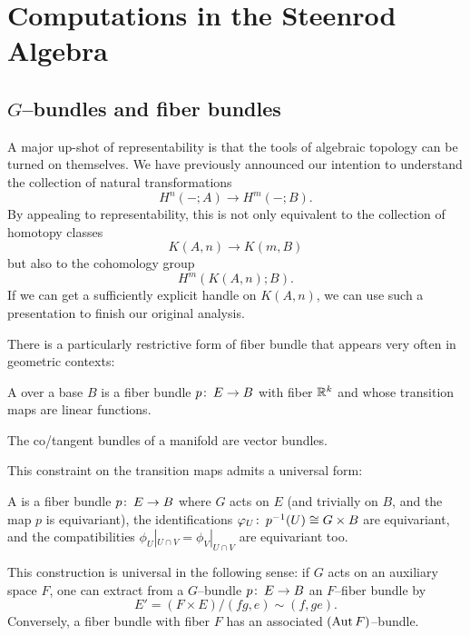 
\chapter{Computations in the Steenrod Algebra}





\section{$G$--bundles and fiber bundles}

A major up-shot of representability is that the tools of algebraic topology can be turned on themselves.
We have previously announced our intention to understand the collection of natural transformations \[H^n(-; A) \to H^m(-; B).\]
By appealing to representability, this is not only equivalent to the collection of homotopy classes \[K(A, n) \to K(m, B)\] but also to the cohomology group \[H^m(K(A, n); B).\]
If we can get a sufficiently explicit handle on $K(A, n)$, we can use such a presentation to finish our original analysis.

There is a particularly restrictive form of fiber bundle that appears very often in geometric contexts:

\begin{definition}
A  over a base $B$ is a fiber bundle $p\colon\thinspace E \to B$ with fiber $\mathbb R^k$ and whose transition maps are linear functions.
\end{definition}

\begin{example}
The co/tangent bundles of a manifold are vector bundles.
\end{example}

\noindent
This constraint on the transition maps admits a universal form:

\begin{definition}
A  is a fiber bundle $p\colon\thinspace E \to B$ where $G$ acts on $E$ (and trivially on $B$, and the map $p$ is equivariant), the identifications $\varphi_U\colon\thinspace p^{-1}(U) \cong G \times B$ are equivariant, and the compatibilities $\phi_U|_{U \cap V} = \phi_V|_{U \cap V}$ are equivariant too.
\end{definition}

\begin{remark}
This construction is universal in the following sense: if $G$ acts on an auxiliary space $F$, one can extract from a $G$--bundle $p\colon\thinspace E \to B$ an $F$--fiber bundle by \[E' = (F \times E) / (fg, e) \sim (f, ge).\]
Conversely, a fiber bundle with fiber $F$ has an associated $(\operatorname{Aut} F)$--bundle.
\end{remark}

